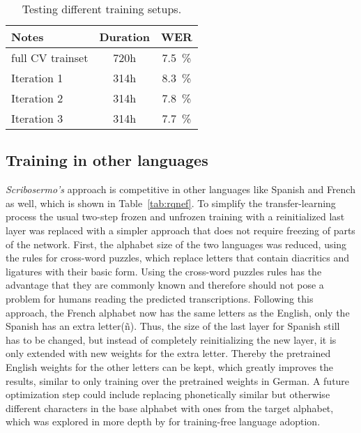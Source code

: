 \documentclass[a4paper]{article}
\begin{document}
\begin{table}[H]
	\caption{Testing different training setups.}
	\label{tab:tdts}
	\centering
	\begin{tabular}{lcc}
		\toprule
		\textbf{Notes}  & \textbf{Duration} & \textbf{WER} \\
		\midrule
		full CV trainset & 720h  & \SI{7.5}{\percent} \\
		\midrule
		Iteration 1 & 314h & \SI{8.3}{\percent} \\
		Iteration 2 & 314h & \SI{7.8}{\percent} \\
		Iteration 3 & 314h & \SI{7.7}{\percent} \\
		\bottomrule
	\end{tabular}
\end{table}

\subsection{Training in other languages}

\textit{Scribosermo's} approach is competitive in other languages like Spanish and French as well, which is shown in Table~\ref{tab:rqnef}. To simplify the transfer-learning process the usual two-step frozen and unfrozen training with a reinitialized last layer was replaced with a simpler approach that does not require freezing of parts of the network.
First, the alphabet size of the two languages was reduced, using the rules for cross-word puzzles, which replace letters that contain diacritics and ligatures with their basic form. Using the cross-word puzzles rules has the advantage that they are commonly known and therefore should not pose a problem for humans reading the predicted transcriptions. Following this approach, the French alphabet now has the same letters as the English, only the Spanish has an extra letter\;(ñ). Thus, the size of the last layer for Spanish still has to be changed, but instead of completely reinitializing the new layer, it is only extended with new weights for the extra letter. Thereby the pretrained English weights for the other letters can be kept, which greatly improves the results, similar to only training over the pretrained weights in German. A future optimization step could include replacing phonetically similar but otherwise different characters in the base alphabet with ones from the target alphabet, which was explored in more depth by \cite{ZRTCSW} for training-free language adoption.
\end{document}
